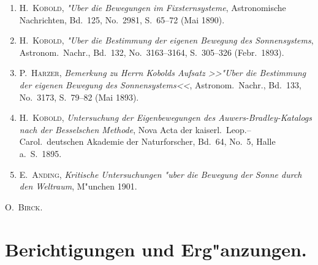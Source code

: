 \documentclass[12pt,a4paper]{article}
\theoremstyle{plain}
\theoremstyle{definition}
\theoremstyle{remark}
\begin{document}
\begin{enumerate}[label=\arabic*.]
\item \textsc{H.\ Kobold}, \textit{"Uber die Bewegungen im Fixsternsysteme}, Astronomische Nachrichten, Bd.~125, No.~2981,
S.~65--72 (Mai 1890).

\item \textsc{H.\ Kobold}, \textit{"Uber die Bestimmung der eigenen Bewegung des Sonnensystems}, Astronom.\ Nachr., Bd.~132,
No.~3163--3164, S.~305--326 (Febr.\ 1893).

\item \textsc{P.\ Harzer}, \textit{Bemerkung zu Herrn Kobolds Aufsatz >>"Uber die Bestimmung der eigenen Bewegung des
Sonnensystems<<}, Astronom.\ Nachr., Bd.~133, No.~3173, S.~79--82 (Mai 1893).

\item \textsc{H.\ Kobold}, \textit{Untersuchung der Eigenbewegungen des Auwers-Bradley-Katalogs nach der Besselschen
Methode}, Nova Acta der kaiserl.\ Leop.--Carol.\ deutschen Akademie der Naturforscher, Bd.~64, No.~5,
Halle a.\ S.\ 1895.

\item \textsc{E.\ Anding}, \textit{Kritische Untersuchungen "uber die Bewegung der Sonne durch den Weltraum}, M"unchen 1901.
\end{enumerate}

\begin{flushright}
\textsc{O.\ Birck.}
\end{flushright}

\newpage
\section*{Berichtigungen und Erg"anzungen.}
\end{document}

